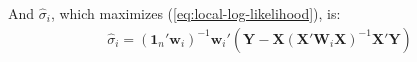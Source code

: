 \documentclass[authoryear, review, 11pt]{elsarticle}
\begin{document}
	And $\hat{\sigma}_i$, which maximizes (\ref{eq:local-log-likelihood}), is:
	\begin{eqnarray}
		\hat{\sigma}_i = \left(\bm{1}_n'\bm{w}_i \right)^{-1} \bm{w}_i'\left(\bm{Y}-\bm{X}\left(\bm{X}'\bm{W}_i\bm{X}\right)^{-1}\bm{X}'\bm{Y}\right)
	\end{eqnarray}
	

\end{document}
